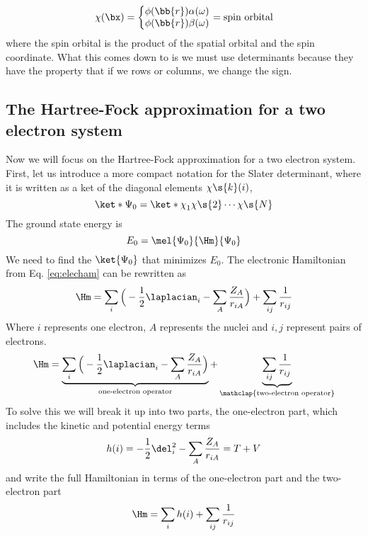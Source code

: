 \documentclass[11pt]{article}
\begin{document}
\begin{equation}
\chi (\bx) = \left\{\begin{matrix} \phi(\bb{r}) \alpha(\omega) \\
\phi(\bb{r})\beta(\omega)
\end{matrix} \right. = \text{spin orbital}
\end{equation}
where the spin orbital is the product of the spatial orbital and the spin coordinate. What this comes down to is we must use determinants because they have the property that if we rows or columns, we change the sign.
\subsection{The Hartree-Fock approximation for a two electron system}
Now we will focus on the Hartree-Fock approximation for a two electron system. First, let us introduce a more compact notation for the Slater determinant, where it is written as a ket of the diagonal elements $\chi\s{k}(i)$, 
\begin{equation}
\ket*{\Psi_0}=\ket*{\chi_{1}^{} \chi\s{2} \cdots \chi\s{N}}
\end{equation}
The ground state energy is 
\begin{equation}
E_0 = \mel{\Psi_0}{\Hm}{\Psi_0}
\end{equation}
We need to find the $\ket{\Psi_0}$ that minimizes $E_0$. The electronic Hamiltonian from Eq. \eqref{eq:elecham} can be rewritten as
\begin{equation}
\Hm = \sum_i \Big( -\frac{1}{2}\laplacian_i - \sum_{A} \frac{Z_A}{r_{iA}}\Big) + \sum_{ij} \frac{1}{r_{ij}}
\end{equation}
Where $i$ represents one electron, $A$ represents the nuclei and $i,j$ represent pairs of electrons. 
\begin{equation*}
\Hm = \underbrace{\sum_i \Big( -\frac{1}{2}\laplacian_i - \sum_{A} \frac{Z_{A} }{r_{iA}}\Big)}_{\text{one-electron operator}} + \underbrace{\sum_{ij} \frac{1}{r_{ij}}}_{\mathclap{\text{two-electron operator}}}
\end{equation*}
To solve this we will break it up into two parts, the one-electron part, which includes the kinetic and potential energy terms 
\begin{equation}
h(i) = -\frac{1}{2}\del_i^2-\sum_A \frac{Z_{A} }{r_{iA}} = T + V
\end{equation}
and write the full Hamiltonian in terms of the one-electron part and the two-electron part
\begin{equation}\label{eq:splitham}
\Hm = \sum_i h(i) + \sum_{ij} \frac{1}{r_{ij}}
\end{equation}
\end{document}
